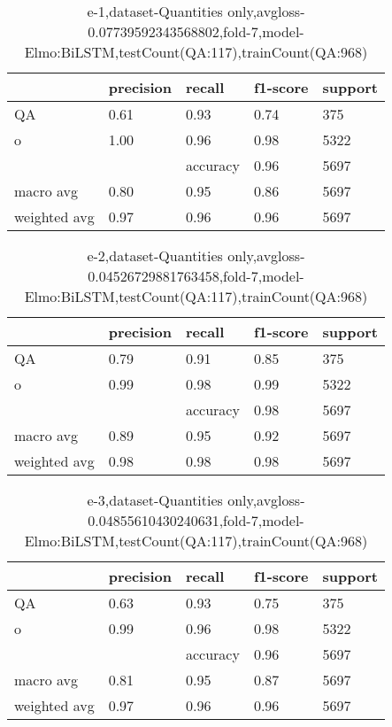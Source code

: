 \begin{table}[!ht] 
\centering
\caption{e-1,dataset-Quantities only,avgloss-0.07739592343568802,fold-7,model-Elmo:BiLSTM,testCount(QA:117),trainCount(QA:968)}\label{e-1data-quantS.tsv}
\begin{tabularx}{300pt}{|X|X|X|X|X|}
\hline
&precision&recall&f1-score&support\\
\hline
QA&0.61&0.93&0.74&375\\
\hline
o&1.00&0.96&0.98&5322\\
\hline
&&accuracy&0.96&5697\\
\hline
macro avg&0.80&0.95&0.86&5697\\
\hline
weighted avg&0.97&0.96&0.96&5697\\
\hline
\end{tabularx}
\end{table}
\begin{table}[!ht] 
\centering
\caption{e-2,dataset-Quantities only,avgloss-0.04526729881763458,fold-7,model-Elmo:BiLSTM,testCount(QA:117),trainCount(QA:968)}\label{e-2data-quantS.tsv}
\begin{tabularx}{300pt}{|X|X|X|X|X|}
\hline
&precision&recall&f1-score&support\\
\hline
QA&0.79&0.91&0.85&375\\
\hline
o&0.99&0.98&0.99&5322\\
\hline
&&accuracy&0.98&5697\\
\hline
macro avg&0.89&0.95&0.92&5697\\
\hline
weighted avg&0.98&0.98&0.98&5697\\
\hline
\end{tabularx}
\end{table}
\begin{table}[!ht] 
\centering
\caption{e-3,dataset-Quantities only,avgloss-0.04855610430240631,fold-7,model-Elmo:BiLSTM,testCount(QA:117),trainCount(QA:968)}\label{e-3data-quantS.tsv}
\begin{tabularx}{300pt}{|X|X|X|X|X|}
\hline
&precision&recall&f1-score&support\\
\hline
QA&0.63&0.93&0.75&375\\
\hline
o&0.99&0.96&0.98&5322\\
\hline
&&accuracy&0.96&5697\\
\hline
macro avg&0.81&0.95&0.87&5697\\
\hline
weighted avg&0.97&0.96&0.96&5697\\
\hline
\end{tabularx}
\end{table}
